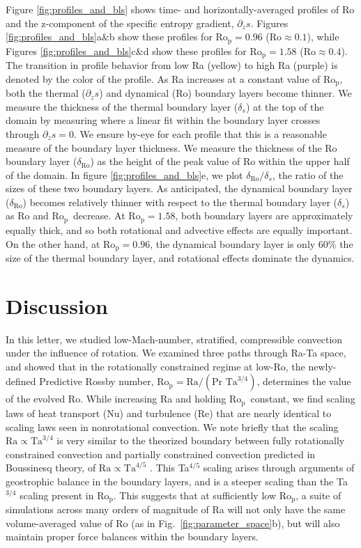 \documentclass[twocolumn, amsmath, amsfonts, amssymb, trackchanges]{aastex62}
\newcommand{\pro}{\ensuremath{\text{Ro}_{\text{p}}}}
\begin{document}
Figure \ref{fig:profiles_and_bls} shows time- and horizontally-averaged profiles of
Ro and the z-component of the specific entropy gradient, $\partial_z s$.
Figures \ref{fig:profiles_and_bls}a\&b show these profiles for $\pro=0.96$ ($\text{Ro} \approx 0.1$), while
Figures \ref{fig:profiles_and_bls}c\&d show these profiles for $\pro=1.58$ ($\text{Ro} \approx 0.4$). The transition
in profile behavior from low Ra (yellow) to high Ra (purple) is denoted by the color of the
profile.
As Ra increases at a constant value of
\pro, both the thermal ($\partial_z s$) and dynamical (Ro) boundary layers become thinner. 
We measure the
thickness of the thermal boundary layer ($\delta_{s}$) at the top of the domain by 
measuring where a linear fit within the boundary layer crosses through $\partial_z s = 0$.
We ensure by-eye for each profile that this is a reasonable measure of the boundary
layer thickness. We measure
the thickness of the Ro boundary layer ($\delta_{\text{Ro}}$) 
as the height of the peak value of Ro within the
upper half of the domain.
In figure \ref{fig:profiles_and_bls}e, we plot $\delta_{\text{Ro}}/\delta_{s}$, the ratio
of the sizes of these two boundary layers. As anticipated, the dynamical boundary layer ($\delta_{\text{Ro}}$)
becomes relatively thinner with respect to the thermal boundary layer ($\delta_{s}$)
as Ro and \pro$\,$ decrease. At $\pro = 1.58$, both boundary layers are approximately equally
thick, and so both rotational and advective effects are equally important. On the other hand,
at $\pro = 0.96$, the dynamical boundary layer is only 60\% the size of the thermal boundary
layer, and rotational effects dominate the dynamics.

\section{Discussion}
\label{sec:discussion}
In this letter, we studied low-Mach-number, stratified, compressible convection 
under the influence of rotation.
We examined three paths through Ra-Ta space, and showed that in the rotationally
constrained regime at low-Ro, the newly-defined 
Predictive Rossby number, $\pro = \text{Ra}/(\text{Pr }\text{Ta}^{3/4})$, determines the value of
the evolved Ro. While increasing Ra and holding \pro$\,$ constant,
we find scaling laws of heat transport (Nu) and turbulence (Re) that are nearly identical
to scaling laws seen in nonrotational convection.
We note briefly that the scaling $\text{Ra} \propto \text{Ta}^{3/4}$ is very similar to
the theorized boundary between fully rotationally constrained convection and 
partially constrained convection predicted in Boussinesq theory, of 
$\text{Ra} \propto \text{Ta}^{4/5}$ \citep{julien&all2012, gastine&all2016}. This
Ta$^{4/5}$ scaling arises through arguments of geostrophic balance in the boundary layers,
and is a steeper scaling than the Ta$^{3/4}$ scaling present in \pro.
This suggests that at sufficiently low \pro, a suite of simulations across many orders
of magnitude of Ra will not only have the same volume-averaged value of Ro 
(as in Fig.~\ref{fig:parameter_space}b), but will
also maintain proper force balances within the boundary layers.
\end{document}
